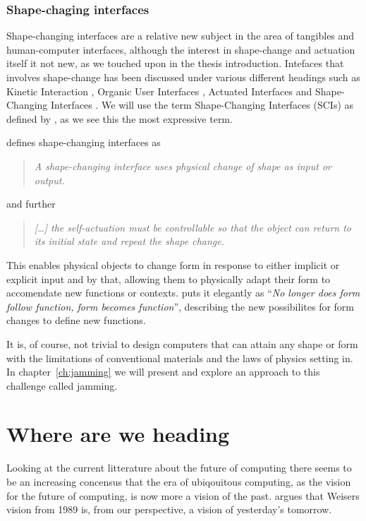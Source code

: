 \subsubsection{Shape-chaging interfaces}
Shape-changing interfaces are a relative new subject in the area of tangibles and human-computer interfaces, although the interest in shape-change and actuation itself it not new, as we touched upon in the thesis introduction.
Intefaces that involves shape-change has been discussed under various different headings such as Kinetic Interaction \citep{parkes2008designing}, Organic User Interfaces \citep{parkes2008designing,holman2008organic}, Actuated Interfaces \citep{poupyrev2007actuation} and Shape-Changing Interfaces \citep{coelho2011shape,rasmussen2012shape}.
We will use the term Shape-Changing Interfaces (SCIs) as defined by \citeauthor{rasmussen2012shape}, as we see this the most expressive term.

\citeauthor{rasmussen2012shape} defines shape-changing interfaces as
\begin{quotation}
  \emph{A shape-changing interface uses physical change of shape as input or output.}
\end{quotation}
and further
\begin{quotation}
  \emph{[\ldots] the self-actuation must be controllable so that the object can return to its initial state and repeat the shape change. }  
\end{quotation}

This enables physical objects to change form in response to either implicit or explicit input and by that, allowing them to physically adapt their form to accomendate new functions or contexts.
\citep{parkes2008designing} puts it elegantly as ``\emph{No longer does form follow function, form becomes function}'', describing the new possibilites for form changes to define new functions.

It is, of course, not trivial to design computers that can attain any shape or form with the limitations of conventional materials and the laws of physics setting in.
In chapter~\ref{ch:jamming} we will present and explore an approach to this challenge called jamming.

\section{Where are we heading}
Looking at the current litterature about the future of computing there seems to be an increasing concensus that the era of ubiqouitous computing, as the vision for the future of computing, is now more a vision of the past.
\citet{bell2007yesterday} argues that Weisers vision from 1989 is, from our perspective, a vision of yesterday's tomorrow.

